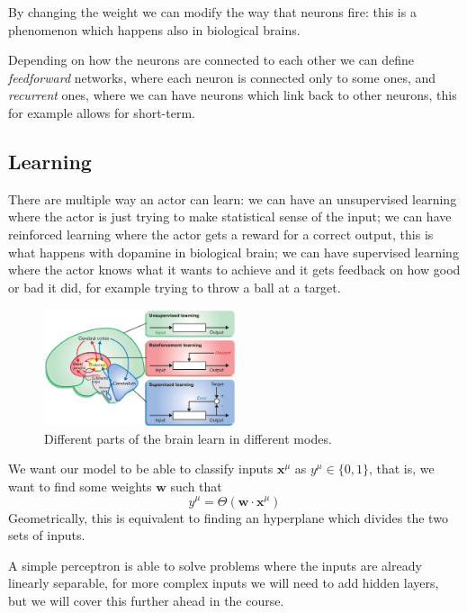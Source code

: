 \documentclass[12pt]{extarticle}
\renewcommand{\vec}[1]{\bm{#1}}
\begin{document}
By changing the weight we can modify the way that neurons fire: this is a phenomenon which happens
also in biological brains.

Depending on how the neurons are connected to each other we can define \emph{feedforward}
networks, where each neuron is connected only to some  ones, and \emph{recurrent} ones,
where we can have neurons which link back to other neurons, this for example allows for short-term.

\subsection{Learning}

There are multiple way an actor can learn: we can have an unsupervised learning where the actor
is just trying to make statistical sense of the input;
we can have reinforced learning where the actor gets a reward for a correct output, this is what
happens with dopamine in biological brain;
we can have supervised learning where the actor knows what it wants to achieve and it gets feedback
on how good or bad it did, for example trying to throw a ball at a target.

\begin{figure}[H]
	\centering
	\includegraphics[width=0.5\textwidth]{./assets/modelling-ml/brain-learning-types.jpg}
	\caption{Different parts of the brain learn in different modes.}
\end{figure}

We want our model to be able to classify inputs $\vec x^\mu$ as $y^\mu \in \{0, 1\}$,
that is, we want to find some weights $\vec w$ such that
\begin{equation}
	y^\mu = \Theta(\vec w \cdot \vec x^\mu)
\end{equation}
Geometrically, this is equivalent to finding an hyperplane which divides the two sets of inputs.

A simple perceptron is able to solve problems where the inputs are already linearly separable,
for more complex inputs we will need to add hidden layers, but we will cover this further
ahead in the course.
\end{document}
